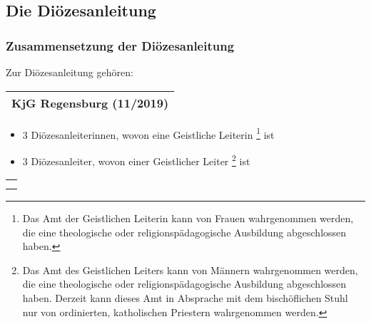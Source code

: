 \documentclass[12pt]{report}
\newcounter{tablecounter}
\newcommand\showcounter{\addtocounter{tablecounter}{1}\thetablecounter}
\begin{document}
\begin{flushleft}
\subsection{Die Diözesanleitung}
\subsubsection{Zusammensetzung der Diözesanleitung}
Zur Diözesanleitung gehören:

\begin{table}[H]
 \begin{tabular}{|l|}
  \hline
  \rowcolor[HTML]{FFCC67} 
  \rule[-1ex]{0pt}{4ex} \textbf{KjG Regensburg (11/2019)}     \hspace{0.6\textwidth} \showcounter        \\ \hline
 \end{tabular}
\end{table}

\begin{itemize}
  \item 3 Diözesanleiterinnen, wovon eine Geistliche Leiterin 
       \footnote{
           Das Amt der Geistlichen Leiterin kann von Frauen wahrgenommen werden, die eine theologische
           oder religionspädagogische Ausbildung abgeschlossen haben.
       }
       ist
  \item 3 Diözesanleiter, wovon einer Geistlicher Leiter
        \footnote{
            Das Amt des Geistlichen Leiters kann von Männern wahrgenommen werden, die eine theologische
            oder religionspädagogische Ausbildung abgeschlossen haben. Derzeit kann dieses Amt in Absprache
            mit dem bischöflichen Stuhl nur von ordinierten, katholischen Priestern wahrgenommen werden.	
        }
        ist
\end{itemize}

\begin{table}[H]
 \begin{tabular}{|l|}
  \hline
  \rowcolor[HTML]{9AFF99} 
  \rule[-1ex]{0pt}{4ex}
  \begin{minipage}[t]{\textwidth}
   \textbf{Änderung:\\}  
    \end{minipage}
  \\ \hline
 \end{tabular}
\end{table}


\end{flushleft}
\end{document}
